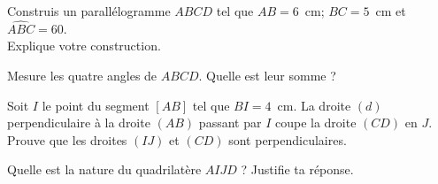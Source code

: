 \begin{myenumerate}
\item Construis un parallélogramme $ABCD$ tel que $AB=6$~cm;
$BC=5$~cm et $\widehat{ABC}=60$\degres.\\Explique votre construction.
\item Mesure les quatre angles de $ABCD$. Quelle est leur somme ?
\item Soit $I$ le point du segment $[AB]$ tel que $BI=4$~cm. La
droite $(d)$ perpendiculaire à la droite $(AB)$ passant par $I$ coupe
la droite $(CD)$ en $J$.
\\Prouve que les droites $(IJ)$ et $(CD)$ sont perpendiculaires.
\item Quelle est la nature du quadrilatère $AIJD$ ? Justifie ta
réponse.
\end{myenumerate}